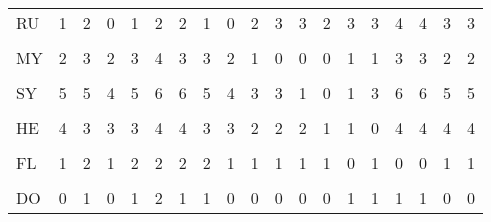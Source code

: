 \begin{table}[H]
{\begin{tabular}[t]{lrrrrrrrrrrrrrrrrrr}
RU & 1 & 2 & 0 & 1 & 2 & 2 & 1 & 0 & 2 & 3 & 3 & 2 & 3 & 3 & 4 & 4 & 3 & 3\\
\cellcolor{gray!6}{VE} & \cellcolor{gray!6}{2} & \cellcolor{gray!6}{2} & \cellcolor{gray!6}{1} & \cellcolor{gray!6}{2} & \cellcolor{gray!6}{3} & \cellcolor{gray!6}{3} & \cellcolor{gray!6}{2} & \cellcolor{gray!6}{1} & \cellcolor{gray!6}{0} & \cellcolor{gray!6}{1} & \cellcolor{gray!6}{1} & \cellcolor{gray!6}{0} & \cellcolor{gray!6}{1} & \cellcolor{gray!6}{1} & \cellcolor{gray!6}{3} & \cellcolor{gray!6}{3} & \cellcolor{gray!6}{2} & \cellcolor{gray!6}{2}\\
MY & 2 & 3 & 2 & 3 & 4 & 3 & 3 & 2 & 1 & 0 & 0 & 0 & 1 & 1 & 3 & 3 & 2 & 2\\
\addlinespace
\cellcolor{gray!6}{KA} & \cellcolor{gray!6}{4} & \cellcolor{gray!6}{5} & \cellcolor{gray!6}{4} & \cellcolor{gray!6}{5} & \cellcolor{gray!6}{6} & \cellcolor{gray!6}{5} & \cellcolor{gray!6}{5} & \cellcolor{gray!6}{4} & \cellcolor{gray!6}{3} & \cellcolor{gray!6}{2} & \cellcolor{gray!6}{0} & \cellcolor{gray!6}{0} & \cellcolor{gray!6}{1} & \cellcolor{gray!6}{3} & \cellcolor{gray!6}{5} & \cellcolor{gray!6}{5} & \cellcolor{gray!6}{4} & \cellcolor{gray!6}{4}\\
SY & 5 & 5 & 4 & 5 & 6 & 6 & 5 & 4 & 3 & 3 & 1 & 0 & 1 & 3 & 6 & 6 & 5 & 5\\
\cellcolor{gray!6}{NO} & \cellcolor{gray!6}{6} & \cellcolor{gray!6}{6} & \cellcolor{gray!6}{5} & \cellcolor{gray!6}{6} & \cellcolor{gray!6}{6} & \cellcolor{gray!6}{7} & \cellcolor{gray!6}{6} & \cellcolor{gray!6}{5} & \cellcolor{gray!6}{4} & \cellcolor{gray!6}{4} & \cellcolor{gray!6}{2} & \cellcolor{gray!6}{1} & \cellcolor{gray!6}{0} & \cellcolor{gray!6}{3} & \cellcolor{gray!6}{5} & \cellcolor{gray!6}{5} & \cellcolor{gray!6}{6} & \cellcolor{gray!6}{6}\\
HE & 4 & 3 & 3 & 3 & 4 & 4 & 3 & 3 & 2 & 2 & 2 & 1 & 1 & 0 & 4 & 4 & 4 & 4\\
\cellcolor{gray!6}{OL} & \cellcolor{gray!6}{1} & \cellcolor{gray!6}{2} & \cellcolor{gray!6}{1} & \cellcolor{gray!6}{2} & \cellcolor{gray!6}{2} & \cellcolor{gray!6}{2} & \cellcolor{gray!6}{2} & \cellcolor{gray!6}{1} & \cellcolor{gray!6}{1} & \cellcolor{gray!6}{1} & \cellcolor{gray!6}{1} & \cellcolor{gray!6}{1} & \cellcolor{gray!6}{0} & \cellcolor{gray!6}{1} & \cellcolor{gray!6}{0} & \cellcolor{gray!6}{0} & \cellcolor{gray!6}{1} & \cellcolor{gray!6}{1}\\
\addlinespace
FL & 1 & 2 & 1 & 2 & 2 & 2 & 2 & 1 & 1 & 1 & 1 & 1 & 0 & 1 & 0 & 0 & 1 & 1\\
\cellcolor{gray!6}{PE} & \cellcolor{gray!6}{0} & \cellcolor{gray!6}{1} & \cellcolor{gray!6}{0} & \cellcolor{gray!6}{1} & \cellcolor{gray!6}{3} & \cellcolor{gray!6}{1} & \cellcolor{gray!6}{1} & \cellcolor{gray!6}{1} & \cellcolor{gray!6}{1} & \cellcolor{gray!6}{1} & \cellcolor{gray!6}{1} & \cellcolor{gray!6}{1} & \cellcolor{gray!6}{2} & \cellcolor{gray!6}{2} & \cellcolor{gray!6}{2} & \cellcolor{gray!6}{2} & \cellcolor{gray!6}{0} & \cellcolor{gray!6}{1}\\
DO & 0 & 1 & 0 & 1 & 2 & 1 & 1 & 0 & 0 & 0 & 0 & 0 & 1 & 1 & 1 & 1 & 0 & 0\\
\bottomrule
\end{tabular}}
\end{table}
